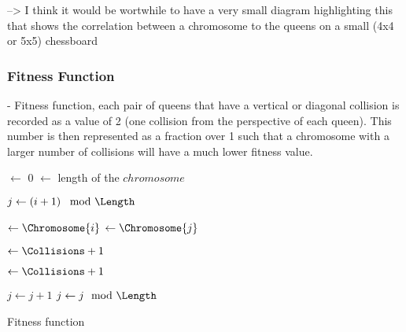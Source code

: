 \documentclass{sig-alternate}
\begin{document}
  --> I think it would be wortwhile to have a very small diagram highlighting this that shows
      the correlation between a chromosome to the queens on a small (4x4 or 5x5) chessboard

\subsubsection{Fitness Function}
- Fitness function, each pair of queens that have a vertical or diagonal collision is 
  recorded as a value of 2 (one collision from the perspective of each queen). This number 
  is then represented  as a fraction over 1 such that a chromosome with a larger number of
  collisions will have a much lower fitness value.
  

\begin{algorithm}
  \SetAlgoLined
  \DontPrintSemicolon
  
  {
    \BlankLine
    
    \Collisions $\leftarrow$ 0\;
    \Length $\leftarrow$ length of the $chromosome$\;
    \BlankLine
    
    {
      $j \leftarrow \left( i + 1 \right) \mod{\Length}$\;
      {
        \Yi $\leftarrow \Chromosome{i}$\;
        \Yj $\leftarrow \Chromosome{j}$\;
        \BlankLine
        
        \If{\Yi == \Yj}
        {
          \Collisions $\leftarrow \Collisions + 1$\; 
        }
        \BlankLine
        
        {
          \Collisions $\leftarrow \Collisions + 1$\;
        }
        \BlankLine
        
        $j \leftarrow j + 1$\;
        $j \leftarrow j \mod{\Length}$\;
      }
    }
    \BlankLine

    {
      \;
    }
    {
      \;
    }
  }
\caption{Fitness function}
\end{algorithm}
\end{document}
